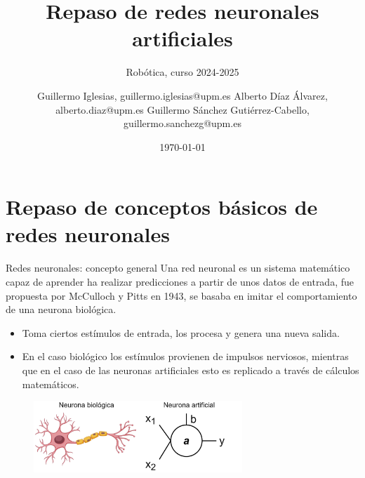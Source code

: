 

\subtitle{Robótica, curso 2024-2025}

\date{\today}
\author{Guillermo Iglesias, guillermo.iglesias@upm.es \newline
Alberto Díaz Álvarez, alberto.diaz@upm.es
\newline
Guillermo Sánchez Gutiérrez-Cabello, guillermo.sanchezg@upm.es}


\title{Repaso de redes neuronales artificiales}


\maketitle

\section{Repaso de conceptos básicos de redes neuronales}

\begin{frame}{Redes neuronales: concepto general}
Una \alert{red neuronal} es un sistema matemático capaz de aprender ha realizar predicciones a partir de unos datos de entrada, fue propuesta por McCulloch y Pitts en 1943\cite{mcculloch1943logical}, se basaba en \alert{imitar} el comportamiento de una neurona biológica.

\begin{itemize}
    \item Toma ciertos \alert{estímulos} de entrada, los procesa y genera una nueva salida.
    \item En el caso biológico los estímulos provienen de \alert{impulsos nerviosos}, mientras que en el caso de las neuronas artificiales esto es replicado a través de cálculos matemáticos.
\end{itemize}

\begin{figure}
    \centering
    \includegraphics[width=0.7\textwidth]{figures/Tema 3/Neurona_Biologica_Artificial.png}
\end{figure}    
\end{frame}

